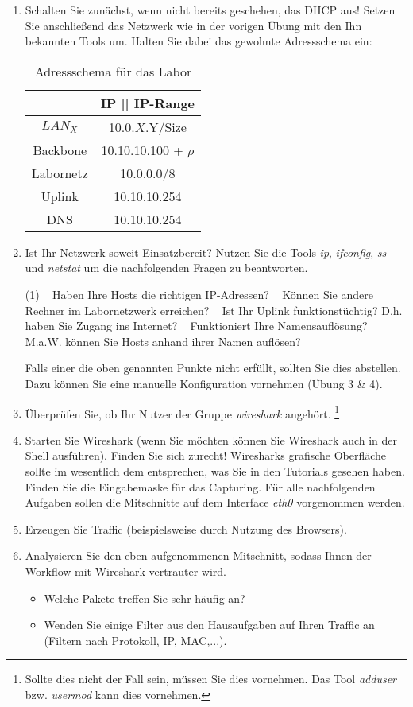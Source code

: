 \documentclass[paper=a4,fontsize=11pt]{scrartcl}%
\numberwithin{equation}{section}
\begin{document}
\begin{enumerate}
	\item Schalten Sie zunächst, wenn nicht bereits geschehen, das DHCP aus! Setzen Sie anschließend das Netzwerk wie in der vorigen Übung mit den Ihn bekannten Tools um. Halten Sie dabei das gewohnte Adressschema ein:
\begin{table}[H]
\caption{Adressschema für das Labor}
\label{adress_scheme}
\centering
\begin{tabular}{|c|c|}\hline
 & \textbf{IP  || IP-Range} \\ \hline
 $LAN_X$ & 10.0.$X$.Y/Size \\ \hline
 Backbone & 10.10.10.100 + $\rho$ \\ \hline
 Labornetz & 10.0.0.0/8 \\ \hline
 Uplink & 10.10.10.254 \\ \hline
 DNS & 10.10.10.254 \\ \hline
\end{tabular}
\end{table} 
	\item Ist Ihr Netzwerk soweit Einsatzbereit? Nutzen Sie die Tools \emph{ip}, \emph{ifconfig}, \emph{ss} und \emph{netstat} um die nachfolgenden Fragen zu beantworten.
	\begin{tasks}(1)
		\task~ Haben Ihre Hosts die richtigen IP-Adressen?
		\task~ Können Sie andere Rechner im Labornetzwerk erreichen?
		\task~ Ist Ihr Uplink funktionstüchtig? D.h. haben Sie Zugang ins Internet?
		\task~ Funktioniert Ihre Namensauflösung? M.a.W. können Sie Hosts anhand ihrer Namen auflösen?
	\end{tasks}
	Falls einer die oben genannten Punkte nicht erfüllt, sollten Sie dies abstellen. Dazu können Sie eine manuelle Konfiguration vornehmen (Übung 3 \& 4).
	\item Überprüfen Sie, ob Ihr Nutzer der Gruppe \emph{wireshark} angehört. \footnote{Sollte dies nicht der Fall sein, müssen Sie dies vornehmen. Das Tool \emph{adduser} bzw. \emph{usermod} kann dies vornehmen.}
	\item Starten Sie Wireshark (wenn Sie möchten können Sie Wireshark auch in der Shell ausführen). Finden Sie sich zurecht! Wiresharks grafische Oberfläche sollte im wesentlich dem entsprechen, was Sie in den Tutorials gesehen haben. Finden Sie die Eingabemaske für das Capturing. Für alle nachfolgenden Aufgaben sollen die Mitschnitte auf dem Interface \emph{eth0} vorgenommen werden. 
	\item Erzeugen Sie Traffic (beispielsweise durch Nutzung des Browsers).
	\item Analysieren Sie den eben aufgenommenen Mitschnitt, sodass Ihnen der Workflow mit Wireshark vertrauter wird.
	\begin{itemize}
		\item Welche Pakete treffen Sie sehr häufig an?
		\item Wenden Sie einige Filter aus den Hausaufgaben auf Ihren Traffic an (Filtern nach Protokoll, IP, MAC,...).
	\end{itemize}
\end{enumerate}
\end{document}
